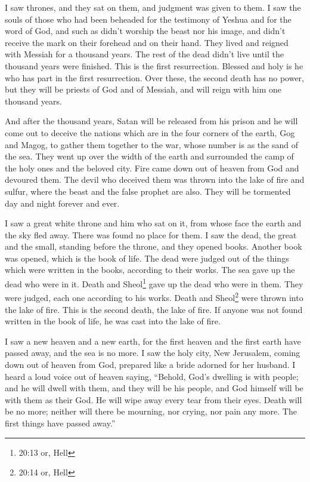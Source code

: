 \myverse{}I saw thrones, and they sat on them, and judgment was given to
them. I saw the souls of those who had been beheaded for the testimony of Yeshua and for the word of God,
and such as didn’t worship the beast nor his image, and didn’t receive the mark on their forehead and
on their hand. They lived and reigned with Messiah for a thousand years.
\myverse{}The rest of the dead didn’t live until the thousand years were finished. This
is the first resurrection.
\myverse{}Blessed and holy is he who has part in the first resurrection. Over these,
the second death has no power, but they will be priests of God and of Messiah, and will reign with him
one thousand years.

\myverse{}And after the thousand years, Satan will be released from his
prison
\myverse{}and he will come out to deceive the nations which are in the four corners of
the earth, Gog and Magog, to gather them together to the war, whose number is as the sand of the sea.
\myverse{}They went up over the width of the earth and surrounded the camp of the holy ones
and the beloved city. Fire came down out of heaven from God and devoured them.
\myverse{}The devil who deceived them was thrown into the lake of fire and sulfur,
where the beast and the false prophet are also. They will be tormented day and night forever and ever.

\myverse{}I saw a great white throne and him who sat on it, from whose
face the earth and the sky fled away. There was found no place for them.
\myverse{}I saw the dead, the great and the small, standing before the throne, and
they opened books. Another book was opened, which is the book of life. The dead were judged out of the
things which were written in the books, according to their works.
\myverse{}The sea gave up the dead who were in it. Death and Sheol\footnote{20:13 or, Hell
} gave up the dead who were in them. They were judged, each one according to his works.
\myverse{}Death and Sheol\footnote{20:14 or, Hell} were thrown into the lake of fire. This is the second death, the lake of fire.
\myverse{}If anyone was not found written in the book of life, he was cast into the
lake of fire.



\mychapter{} \myverse*{}I saw a new heaven and a new earth, for the first heaven and the
first earth have passed away, and the sea is no more.
\myverse{}I saw the holy city, New Jerusalem, coming down out of heaven from God, prepared
like a bride adorned for her husband.
\myverse{}I heard a loud voice out of heaven saying, “Behold, God’s dwelling is with
people; and he will dwell with them, and they will be his people, and God himself will be with them as
their God.
\myverse{}He will wipe away every tear from their eyes. Death will be no more; neither
will there be mourning, nor crying, nor pain any more. The first things have passed away.”

